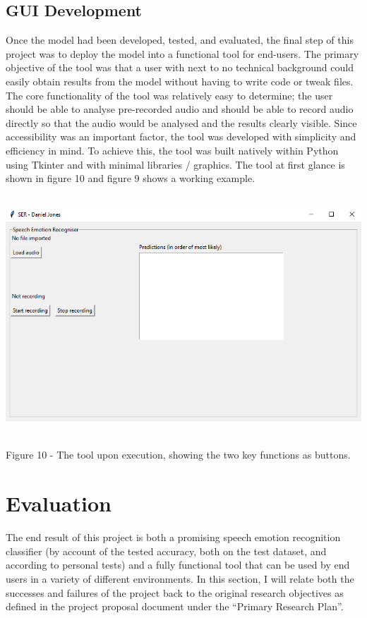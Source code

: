 \documentclass[12pt]{article}
\begin{document}
\subsection{GUI Development}
Once the model had been developed, tested, and evaluated, the final step of this project was to deploy the model into a functional tool for end-users. The primary objective of the tool was that a user with next to no technical background could easily obtain results from the model without having to write code or tweak files. The core functionality of the tool was relatively easy to determine; the user should be able to analyse pre-recorded audio and should be able to record audio directly so that the audio would be analysed and the results clearly visible. Since accessibility was an important factor, the tool was developed with simplicity and efficiency in mind. To achieve this, the tool was built natively within Python using Tkinter and with minimal libraries / graphics. The tool at first glance is shown in figure 10 and figure 9 shows a working example.
\begin{center}
\includegraphics[width=16cm, height=9cm]{figure_10_finished_tool}
\end{center}
Figure 10 - The tool upon execution, showing the two key functions as buttons.
\section{Evaluation}
The end result of this project is both a promising speech emotion recognition classifier (by account of the tested accuracy, both on the test dataset, and according to personal tests) and a fully functional tool that can be used by end users in a variety of different environments. In this section, I will relate both the successes and failures of the project back to the original research objectives as defined in the project proposal document under the ``Primary Research Plan''.
\end{document}

